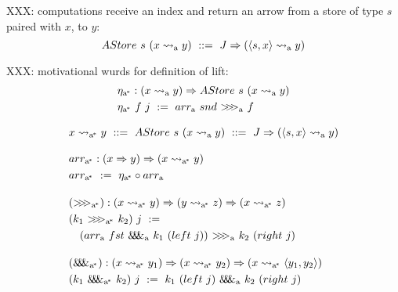 \documentclass[preprint]{sigplanconf}
\newcommand{\arrow}{\rightsquigarrow}
\newcommand{\arrowarr}{\ensuremath{arr}}
\newcommand{\arrowcomp}{\ensuremath{{>}\mspace{-6mu}{>}\mspace{-6mu}{>}}}
\newcommand{\arrowpair}{\ensuremath{\mathit{\&\mspace{-7.5mu}\&\mspace{-7.5mu}\&}}}
\newcommand{\arrowtrans}{\ensuremath{\eta}}
\newcommand{\gen}{_\mathrm{a}}
\newcommand{\genc}{_\mathrm{a^{\mspace{-2mu}*}}}
\begin{document}
XXX: computations receive an index and return an arrow from a store of type $s$ paired with $x$, to $y$:
\begin{equation}
	AStore~s~(x \arrow\gen y) \ ::= \ J \tto (\pair{s,x} \arrow\gen y)
\end{equation}

XXX: motivational wurds for definition of lift:
\begin{equation}
\begin{aligned}
	&\arrowtrans\genc : (x \arrow\gen y) \tto AStore~s~(x \arrow\gen y) \\
	&\arrowtrans\genc~f~j \ := \ \arrowarr\gen~snd~\arrowcomp\gen~f
\end{aligned}
\end{equation}

\begin{figure*}[t]\centering
\begin{align*}
\begin{aligned}[t]
	&\begin{aligned}[t]
		x \arrow\genc y \ ::= \ AStore~s~(x \arrow\gen y) \ ::= \ J \tto (\pair{s,x} \arrow\gen y)
	\end{aligned} \\
\\[-6pt]
	&\begin{aligned}[t]
		&\arrowarr\genc : (x \tto y) \tto (x \arrow\genc y) \\
		&\arrowarr\genc \ := \ \arrowtrans\genc \circ \arrowarr\gen
	\end{aligned} \\
\\[-6pt]
	&\begin{aligned}[t]
		&(\arrowcomp\genc) : (x \arrow\genc y) \tto (y \arrow\genc z) \tto (x \arrow\genc z) \\
		&(k_1~\arrowcomp\genc~k_2)~j \ := \\
			&\tab(\arrowarr\gen~fst~\arrowpair\gen~k_1~(left~j))~\arrowcomp\gen~k_2~(right~j)
	\end{aligned} \\
\\[-6pt]
	&\begin{aligned}[t]
		&(\arrowpair\genc) : (x \arrow\genc y_1) \tto (x \arrow\genc y_2) \tto (x \arrow\genc \pair{y_1,y_2}) \\
		&(k_1~\arrowpair\genc~k_2)~j \ := \ k_1~(left~j)~\arrowpair\gen~k_2~(right~j)
	\end{aligned} \\
\end{aligned}

\end{align*}
\end{figure*}
\end{document}
